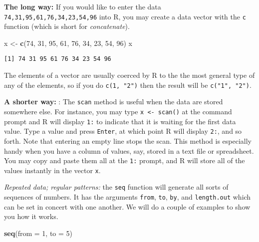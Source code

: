 \documentclass[]{book}
\newenvironment{Shaded}{\begin{snugshade}}{\end{snugshade}}
\newcommand{\KeywordTok}[1]{\textcolor[rgb]{0.13,0.29,0.53}{\textbf{{#1}}}}
\newcommand{\DataTypeTok}[1]{\textcolor[rgb]{0.13,0.29,0.53}{{#1}}}
\newcommand{\DecValTok}[1]{\textcolor[rgb]{0.00,0.00,0.81}{{#1}}}
\newcommand{\StringTok}[1]{\textcolor[rgb]{0.31,0.60,0.02}{{#1}}}
\newcommand{\NormalTok}[1]{{#1}}
\numberwithin{equation}{chapter}
\numberwithin{figure}{chapter}
\theoremstyle{plain}
\theoremstyle{definition}
\theoremstyle{remark}
\theoremstyle{definition}
\theoremstyle{definition}
\theoremstyle{remark}
\begin{document}
\textbf{The long way:}  If you would like to enter
the data \texttt{74,31,95,61,76,34,23,54,96} into R, you may create a
data vector with the \texttt{c} function (which is short for
\emph{concatenate}).

\begin{Shaded}
\begin{Highlighting}[]
\NormalTok{x <-}\StringTok{ }\KeywordTok{c}\NormalTok{(}\DecValTok{74}\NormalTok{, }\DecValTok{31}\NormalTok{, }\DecValTok{95}\NormalTok{, }\DecValTok{61}\NormalTok{, }\DecValTok{76}\NormalTok{, }\DecValTok{34}\NormalTok{, }\DecValTok{23}\NormalTok{, }\DecValTok{54}\NormalTok{, }\DecValTok{96}\NormalTok{)}
\NormalTok{x}
\end{Highlighting}
\end{Shaded}

\begin{verbatim}
[1] 74 31 95 61 76 34 23 54 96
\end{verbatim}

The elements of a vector are usually coerced by R to the the most
general type of any of the elements, so if you do \texttt{c(1,\ "2")}
then the result will be \texttt{c("1",\ "2")}.

\textbf{A shorter way:} : The \texttt{scan}
method is useful when the data are stored somewhere else. For instance,
you may type \texttt{x\ \textless{}-\ scan()} at the command prompt and
R will display \texttt{1:} to indicate that it is waiting for the first
data value. Type a value and press \texttt{Enter}, at which point R will
display \texttt{2:}, and so forth. Note that entering an empty line
stops the scan. This method is especially handy when you have a column
of values, say, stored in a text file or spreadsheet. You may copy and
paste them all at the \texttt{1:} prompt, and R will store all of the
values instantly in the vector \texttt{x}.

\emph{Repeated data; regular patterns:} the \texttt{seq}
 function will generate all sorts of sequences
of numbers. It has the arguments \texttt{from}, \texttt{to},
\texttt{by}, and \texttt{length.out} which can be set in concert with
one another. We will do a couple of examples to show you how it works.

\begin{Shaded}
\begin{Highlighting}[]
\KeywordTok{seq}\NormalTok{(}\DataTypeTok{from =} \DecValTok{1}\NormalTok{, }\DataTypeTok{to =} \DecValTok{5}\NormalTok{)}
\end{Highlighting}
\end{Shaded}
\end{document}
